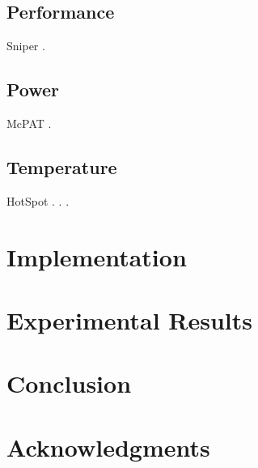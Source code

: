 \documentclass[conference]{IEEEtran}
\begin{document}
  \subsection{Performance}
  Sniper \cite{carlson2011}.

  \subsection{Power}
  McPAT \cite{li2009}.

  \subsection{Temperature}
  HotSpot \cite{skadron2004}.
   \cite{sridhar2010}.
  \cite{ukhov2012}.

  \section{Implementation}
  

  \section{Experimental Results}

  \section{Conclusion}
  

  \section*{Acknowledgments}
  

  \begingroup
    
    
  \endgroup
\end{document}
